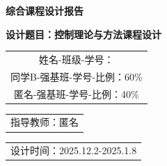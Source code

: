 \documentclass[a4paper,zihao=-4]{article}
\numberwithin{equation}{section}
\numberwithin{figure}{section}
\numberwithin{table}{section}
\begin{document}
	
	\begin{titlepage}
		\centering
		\vspace*{2cm}
		
		{\bfseries 综合课程设计报告\par}
		
		\vspace{3cm}
		
		{\bfseries 设计题目：控制理论与方法课程设计\par}
		
		\vspace{3cm}
		
		{
			\begin{tabular}{c}
				姓名-班级-学号：\\
				同学B-强基班-学号-比例：60\% \\
				匿名-强基班-学号-比例：40\% \\
			\end{tabular}\par}
		
		\vspace{2cm}
		
		{
			\begin{tabular}{c}
				指导教师：匿名\\
			\end{tabular}\par}
		
		\vspace{2cm}
		
		{
			\begin{tabular}{c}
				设计时间：2025.12.2-2025.1.8\\
			\end{tabular}\par}
		
		\vfill
	\end{titlepage}
	
	\newpage
	\tableofcontents
	\newpage
	
	\setcounter{page}{1}
	
\end{document}
